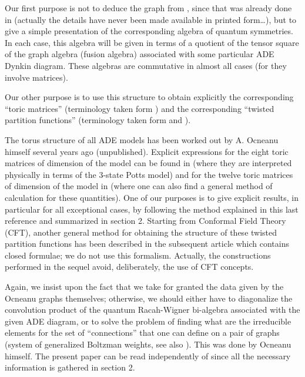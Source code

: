 \documentclass[a4paper,11pt]{article}
\begin{document}
Our first purpose is not to deduce the graph \coordHE{} from \coordHE{},
since that was already done in \coordHE{} (actually the details
have never been made available in printed form\ldots), but to give a
simple  presentation of the corresponding algebra of quantum
symmetries.
In each case, this algebra will be given in terms of a quotient of
the tensor square of the graph algebra (fusion algebra) associated
with some particular ADE Dynkin diagram. These algebras \coordHE{} are commutative
in almost all cases (for \coordHE{} they involve \coordHE{} matrices).

Our other purpose is to use this structure to obtain explicitly the
corresponding ``toric matrices'' (terminology taken form
\cite{Coque:qtetra}) and the corresponding ``twisted partition
functions'' (terminology taken form \cite{PetZub:bcft} and
\cite{PetZub:Oc}).

The torus structure of all ADE models has  been worked out by
A. Ocneanu himself several years ago (unpublished).
Explicit expressions for the eight toric matrices of
dimension \coordHE{} of the \coordHE{} model can be found in \cite{PetZub:bcft}
(where they are interpreted
physically in terms of the 3-state Potts model) and for the twelve toric matrices
of dimension \coordHE{} of the  \coordHE{} model in \cite{Coque:qtetra}
(where one can also find a general method of calculation for these 
quantities). One of our purposes is to give explicit results, in particular for
all exceptional cases, by following the method explained in this last 
reference \cite{Coque:qtetra} and summarized in section 2.
Starting from Conformal Field Theory (CFT), another general method for obtaining the
structure of these twisted partition functions has been described in the
subsequent article \cite{PetZub:Oc} which contains closed formulae;
we do not use this formalism. Actually, 
the constructions performed in the sequel avoid, deliberately, the use of CFT concepts.

Again, we insist upon the fact that we take for granted the data given
by the Ocneanu graphs themselves; otherwise, we should either have to
diagonalize the convolution product of the quantum Racah-Wigner bi-algebra
associated with the given ADE diagram, or to solve the problem of finding
what are the irreducible elements for the set of  ``connections''
that one can define on a pair of graphs (system of generalized
Boltzman weights, see also \cite{Roche:Oc}). This was done by Ocneanu himself.
The present paper can be read independently of \cite{Coque:qtetra} since 
all the necessary information is gathered in section 2.
\end{document}
